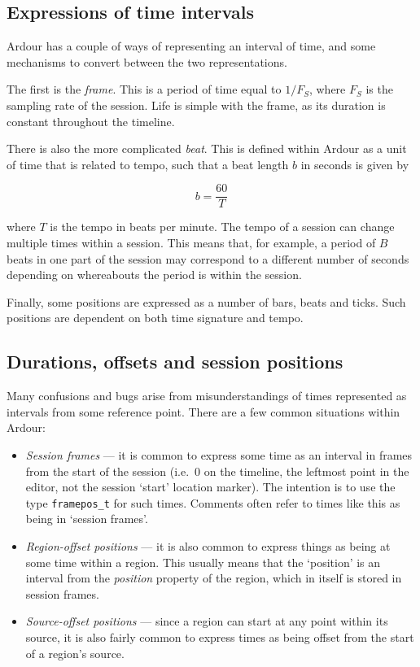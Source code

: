 \documentclass[10pt,a4paper]{book}
\newcommand{\code}[1]{\texttt{#1}}
\begin{document}
\subsection{Expressions of time intervals}

Ardour has a couple of ways of representing an interval of time, and
some mechanisms to convert between the two representations.

The first is the \emph{frame}.  This is a period of time equal to
$1/F_S$, where $F_S$ is the sampling rate of the session.  Life is
simple with the frame, as its duration is constant throughout the
timeline. 

There is also the more complicated \emph{beat}.  This is defined
within Ardour as a unit of time that is related to tempo, such that a
beat length $b$ in seconds is given by

\begin{equation}
b = \frac{60}{T}
\end{equation}

where $T$ is the tempo in beats per minute.  The tempo of a session
can change multiple times within a session.  This means that, for
example, a period of $B$ beats in one part of the session may
correspond to a different number of seconds depending on whereabouts
the period is within the session.

Finally, some positions are expressed as a number of bars, beats and
ticks.  Such positions are dependent on both time signature and
tempo.


\subsection{Durations, offsets and session positions}

Many confusions and bugs arise from misunderstandings of times
represented as intervals from some reference point.  There are a few
common situations within Ardour:

\begin{itemize}
\item \emph{Session frames} --- it is common to express some time as
  an interval in frames from the start of the session (i.e.\ $0$ on
  the timeline, the leftmost point in the editor, not the session
  `start' location marker).  The intention is to use the type
  \code{framepos\_t} for such times.  Comments often refer to times
  like this as being in `session frames'.
\item \emph{Region-offset positions} --- it is also common to express
  things as being at some time within a region.  This usually means
  that the `position' is an interval from the \emph{position} property
  of the region, which in itself is stored in session frames.
\item \emph{Source-offset positions} --- since a region can start at
  any point within its source, it is also fairly common to express
  times as being offset from the start of a region's source.
\end{itemize}
\end{document}
